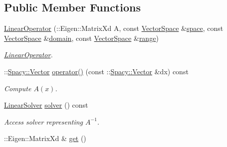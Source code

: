 \subsection*{Public Member Functions}
\begin{DoxyCompactItemize}
\item 
\hyperlink{classSpacy_1_1Rn_1_1LinearOperator_a5766be9cde54684c7318cc0f58fcda4c}{Linear\+Operator} (\+::Eigen\+::\+Matrix\+Xd A, const \hyperlink{classSpacy_1_1VectorSpace}{Vector\+Space} \&\hyperlink{classSpacy_1_1VectorBase_aa999dbf9d679d895dfe04c10fbf9f5e9}{space}, const \hyperlink{classSpacy_1_1VectorSpace}{Vector\+Space} \&\hyperlink{classSpacy_1_1OperatorBase_a2588f9b3e0188820c4c494e63293dc6f}{domain}, const \hyperlink{classSpacy_1_1VectorSpace}{Vector\+Space} \&\hyperlink{classSpacy_1_1OperatorBase_ab19d3b7a6f290b1079248f1e567e53d6}{range})
\begin{DoxyCompactList}\small\item\em \hyperlink{classSpacy_1_1Rn_1_1LinearOperator}{Linear\+Operator}. \end{DoxyCompactList}\item 
\hypertarget{classSpacy_1_1Rn_1_1LinearOperator_a804fce53cb8c2d1937fd0eae41718039}{}\+::\hyperlink{classSpacy_1_1Vector}{Spacy\+::\+Vector} \hyperlink{classSpacy_1_1Rn_1_1LinearOperator_a804fce53cb8c2d1937fd0eae41718039}{operator()} (const \+::\hyperlink{classSpacy_1_1Vector}{Spacy\+::\+Vector} \&dx) const \label{classSpacy_1_1Rn_1_1LinearOperator_a804fce53cb8c2d1937fd0eae41718039}

\begin{DoxyCompactList}\small\item\em Compute $A(x)$. \end{DoxyCompactList}\item 
\hypertarget{classSpacy_1_1Rn_1_1LinearOperator_a82989d016d28e2ae1fe5fa3d65df783d}{}\hyperlink{classSpacy_1_1Rn_1_1LinearSolver}{Linear\+Solver} \hyperlink{classSpacy_1_1Rn_1_1LinearOperator_a82989d016d28e2ae1fe5fa3d65df783d}{solver} () const \label{classSpacy_1_1Rn_1_1LinearOperator_a82989d016d28e2ae1fe5fa3d65df783d}

\begin{DoxyCompactList}\small\item\em Access solver representing $A^{-1}$. \end{DoxyCompactList}\item 
\hypertarget{classSpacy_1_1Mixin_1_1Get_aaa3afedcb9b9e943f81d1686b70417db}{}\+::Eigen\+::\+Matrix\+Xd \& \hyperlink{classSpacy_1_1Mixin_1_1Get_aaa3afedcb9b9e943f81d1686b70417db}{get} ()\label{classSpacy_1_1Mixin_1_1Get_aaa3afedcb9b9e943f81d1686b70417db}


\end{DoxyCompactItemize}
